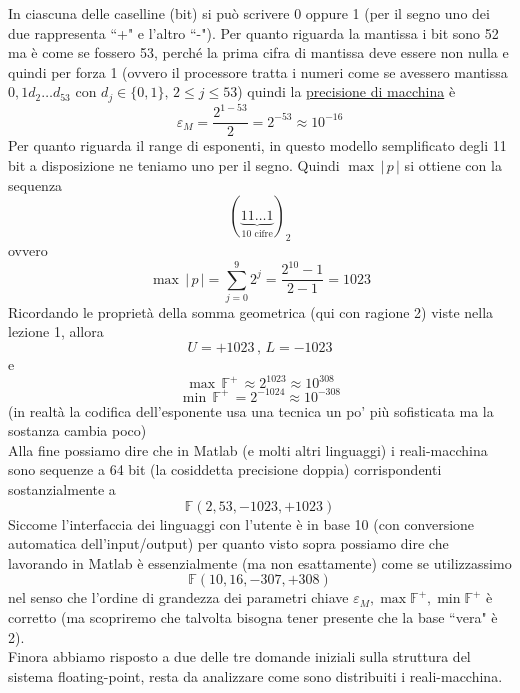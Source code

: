 In ciascuna delle caselline (bit) si può scrivere 0 oppure 1 (per il segno uno dei due rappresenta ``+" e l'altro ``-"). Per quanto riguarda la mantissa i bit sono 52 ma è come se fossero 53, perché la prima cifra di mantissa deve essere non nulla e quindi per forza 1 (ovvero il processore tratta i numeri come se avessero mantissa $0,1 d_2 \dotsc d_{53}$ con $d_j \in \{0,1\},\, 2 \le j \le 53$) quindi la \uline{precisione di macchina} è
\[ \varepsilon_M = \frac{2^{1-53}}{2} = 2^{-53} \approx 10^{-16}\]
Per quanto riguarda il range di esponenti, in questo modello semplificato degli 11 bit a disposizione ne teniamo uno per il segno. Quindi $\max \, \lvert \, p \, \rvert$ si ottiene con la sequenza
\[ (\underbrace{11\dotsc1}_{\text{10 cifre}})_2 \]
ovvero
\[ \max \, \lvert \, p \, \rvert = \sum_{j=0}^9 2^j = \frac{2^{10} - 1}{2 - 1} = 1023 \]
Ricordando le proprietà della somma geometrica (qui con ragione 2) viste nella lezione 1, allora \[ U = +1023 \,,\, L = -1023 \] e
\[ \max \, \mathbb{F}^+ \, \approx 2^{1023} \approx 10^{308}\]
\[ \min \, \mathbb{F}^+ \, = 2^{-1024} \approx 10^{-308}\]
(in realtà la codifica dell'esponente usa una tecnica un po' più sofisticata ma la sostanza cambia poco) \\
Alla fine possiamo dire che in Matlab (e molti altri linguaggi) i reali-macchina sono sequenze a 64 bit (la cosiddetta precisione doppia) corrispondenti sostanzialmente a
\[ \mathbb{F}(2, 53, -1023, +1023) \]
Siccome l'interfaccia dei linguaggi con l'utente è in base 10 (con conversione automatica dell'input/output) per quanto visto sopra possiamo dire che lavorando in Matlab è essenzialmente (ma non esattamente) come se utilizzassimo
\[ \mathbb{F}(10, 16, -307, +308) \]
nel senso che l'ordine di grandezza dei parametri chiave $\varepsilon_M, \max \mathbb{F}^+, \min \mathbb{F}^+$ è corretto (ma scopriremo che talvolta bisogna tener presente che la base ``vera" è 2). \\
Finora abbiamo risposto a due delle tre domande iniziali sulla struttura del sistema floating-point, resta da analizzare come sono distribuiti i reali-macchina.

